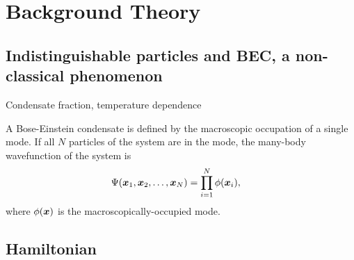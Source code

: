 \chapter{Background Theory}
\label{BackgroundTheory}
\graphicspath{{Figures/BackgroundTheory/}{Figures/Common/}}


\section{Indistinguishable particles and BEC, a non-classical phenomenon}

Condensate fraction, temperature dependence

A Bose-Einstein condensate is defined by the macroscopic occupation of a single mode.  If all $N$ particles of the system are in the mode, the many-body wavefunction of the system is
\begin{align}
    \Psi(\vect{x}_1, \vect{x}_2, \dots, \vect{x}_N) &= \prod_{i=1}^{N} \phi(\vect{x}_i), \label{BackgroundTheory:ManyBodyWavefunction}
\end{align}
where $\phi(\bm{x})$ is the macroscopically-occupied mode.  


\section{Hamiltonian}

